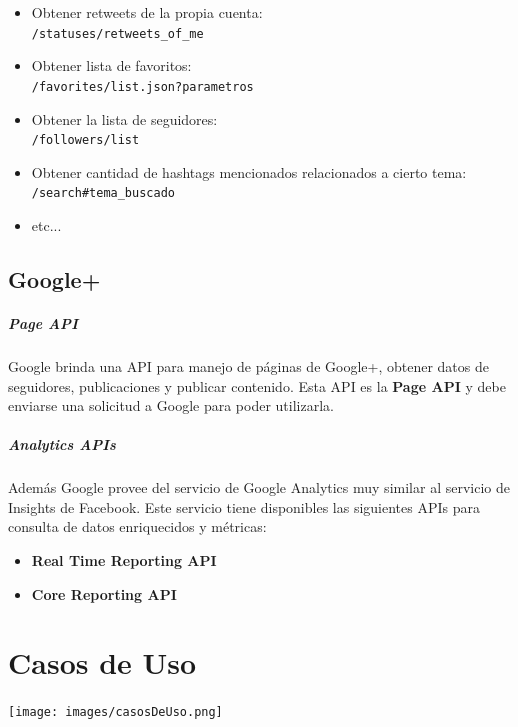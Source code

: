 \documentclass[oneside]{book}
\begin{document}
	\begin{itemize}
		\item Obtener retweets de la propia cuenta:  \\
		\texttt{/statuses/retweets\_of\_me}

		\item Obtener lista de favoritos: \\
		\texttt{/favorites/list.json?parametros}

		\item Obtener la lista de seguidores:\\
		\texttt{/followers/list}
	
		\item Obtener cantidad de hashtags mencionados relacionados a cierto tema:\\
		\texttt{/search\#tema\_buscado}
	
		\item etc...

	\end{itemize}	 

\bigskip

\subsection{Google+}

	\subparagraph*{Page API}
	Google brinda una API para manejo de páginas de Google+, obtener datos de seguidores, publicaciones y publicar contenido. Esta API es la \textbf{Page API} y debe enviarse una solicitud a Google para poder utilizarla.
	\subparagraph*{Analytics APIs}
Además Google provee del servicio de Google Analytics muy similar al servicio de Insights de Facebook. Este servicio tiene disponibles las siguientes APIs para consulta de datos enriquecidos y métricas:
	\begin{itemize}
		\item \textbf{Real Time Reporting API} 
		\item \textbf{Core Reporting API}
	\end{itemize}





\newpage


\section{Casos de Uso}

\texttt{[image: images/casosDeUso.png]}
\end{document}
